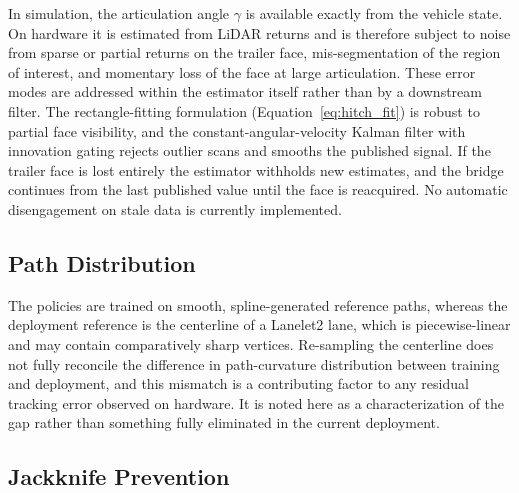 In simulation, the articulation angle $\gamma$ is available exactly from the vehicle state. On hardware it is estimated from LiDAR returns and is therefore subject to noise from sparse or partial returns on the trailer face, mis-segmentation of the region of interest, and momentary loss of the face at large articulation. These error modes are addressed within the estimator itself rather than by a downstream filter. The rectangle-fitting formulation (Equation~\ref{eq:hitch_fit}) is robust to partial face visibility, and the constant-angular-velocity Kalman filter with innovation gating rejects outlier scans and smooths the published signal. If the trailer face is lost entirely the estimator withholds new estimates, and the bridge continues from the last published value until the face is reacquired. No automatic disengagement on stale data is currently implemented.

\subsection{Path Distribution}

The policies are trained on smooth, spline-generated reference paths, whereas the deployment reference is the centerline of a Lanelet2 lane, which is piecewise-linear and may contain comparatively sharp vertices. Re-sampling the centerline does not fully reconcile the difference in path-curvature distribution between training and deployment, and this mismatch is a contributing factor to any residual tracking error observed on hardware. It is noted here as a characterization of the gap rather than something fully eliminated in the current deployment.

\subsection{Jackknife Prevention}


